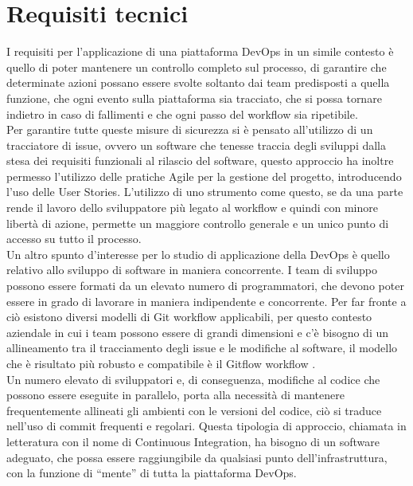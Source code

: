 \documentclass[a4paper, 12pt]{report}
\numberwithin{equation}{section}
\begin{document}
\section{Requisiti tecnici}\label{requisiti-tech}
I requisiti per l’applicazione di una piattaforma DevOps in un simile contesto è quello di poter mantenere un controllo completo sul processo, di garantire che determinate azioni possano essere svolte soltanto dai team predisposti a quella funzione, che ogni evento sulla piattaforma sia tracciato, che si possa tornare indietro in caso di fallimenti e che ogni passo del workflow sia ripetibile.\\
Per garantire tutte queste misure di sicurezza si è pensato all’utilizzo di un tracciatore di issue, ovvero un software che tenesse traccia degli sviluppi dalla stesa dei requisiti funzionali al rilascio del software, questo approccio ha inoltre permesso l’utilizzo delle pratiche Agile per la gestione del progetto, introducendo l’uso delle User Stories. L’utilizzo di uno strumento come questo, se da una parte rende il lavoro dello sviluppatore più legato al workflow e quindi con minore libertà di azione, permette un maggiore controllo generale e un unico punto di accesso su tutto il processo.\\
Un altro spunto d’interesse per lo studio di applicazione della DevOps è quello relativo allo sviluppo di software in maniera concorrente. I team di sviluppo possono essere formati da un elevato numero di programmatori, che devono poter essere in grado di lavorare in maniera indipendente e concorrente. Per far fronte a ciò esistono diversi modelli di Git workflow applicabili, per questo contesto aziendale in cui i team possono essere di grandi dimensioni e c’è bisogno di un allineamento tra il tracciamento degli issue e le modifiche al software, il modello che è risultato più robusto e compatibile è il Gitflow workflow \cite{driessen-gitflow}.\\
Un numero elevato di sviluppatori e, di conseguenza, modifiche al codice che possono essere eseguite in parallelo, porta alla necessità di mantenere frequentemente allineati gli ambienti con le versioni del codice, ciò si traduce nell’uso di commit frequenti e regolari. Questa tipologia di approccio, chiamata in letteratura con il nome di Continuous Integration, ha bisogno di un software adeguato, che possa essere raggiungibile da qualsiasi punto dell’infrastruttura, con la funzione di “mente” di tutta la piattaforma DevOps.
\end{document}
